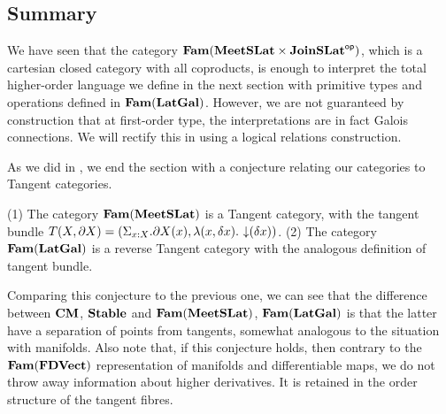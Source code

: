 \subsection{Summary}
\label{sec:models:summary}

We have seen that the category $\mathbf{Fam}(\mathbf{MeetSLat} \times \mathbf{JoinSLat}^{\mathsf{op}})$,
which is a cartesian closed category with all coproducts, is enough to
interpret the total higher-order language we define in the next
section with primitive types and operations defined in
$\mathbf{Fam}(\mathbf{LatGal})$. However, we are not guaranteed by construction that
at first-order type, the interpretations are in fact Galois
connections. We will rectify this in  using a
logical relations construction.

As we did in , we end the section with a
conjecture relating our categories to Tangent categories.

\begin{conjecture}
  \label{con:tangent-fam}
  (1) The category $\mathbf{Fam}(\mathbf{MeetSLat})$ is a Tangent category, with the
  tangent bundle
  $T(X, \partial X) = (\Sigma_{x : X}. \partial X(x), \lambda (x,
  \delta x).\, \mathop{\downarrow}(\delta x))$. (2) The category $\mathbf{Fam}(\mathbf{LatGal})$
  is a reverse Tangent category with the analogous definition of
  tangent bundle.
\end{conjecture}

Comparing this conjecture to the previous one, we can see that the
difference between $\mathbf{CM}$, $\mathbf{Stable}$ and $\mathbf{Fam}(\mathbf{MeetSLat})$,
$\mathbf{Fam}(\mathbf{LatGal})$ is that the latter have a separation of points from
tangents, somewhat analogous to the situation with manifolds. Also
note that, if this conjecture holds, then contrary to the
$\mathbf{Fam}(\mathbf{FDVect})$ representation of manifolds and differentiable maps,
we do not throw away information about higher derivatives. It is
retained in the order structure of the tangent fibres.
